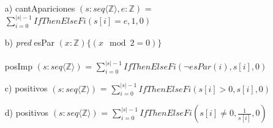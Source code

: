 \documentclass{article}
\begin{document}
\begin{itemize}
    \item[a) ] \Large{cantApariciones $(s:seq\langle \mathbb{Z} \rangle, e:\mathbb{Z})$ = $\displaystyle\sum_{i=0}^{|s|-1}IfThenElseFi(s[i]=e,1,0)$}\\
    
    \item [b) ] \textit{pred} esPar $(x:\mathbb{Z})\{(x \mod 2 = 0)\}$\\\\
    posImp $(s:seq\langle \mathbb{Z} \rangle)$ = $\displaystyle\sum_{i=0}^{|s|-1}IfThenElseFi(\neg esPar(i),s[i],0)$\\
    
    \item[c) ] positivos $(s:seq\langle \mathbb{Z} \rangle)$ = $\displaystyle\sum_{i=0}^{|s|-1}IfThenElseFi(s[i]>0,s[i],0)$\\
    
    \item[d) ] positivos $(s:seq\langle \mathbb{Z} \rangle)$ = $\displaystyle\sum_{i=0}^{|s|-1}IfThenElseFi(s[i]\neq0,\frac{1}{s[i]},0)$\\\\
\end{itemize}
\end{document}
